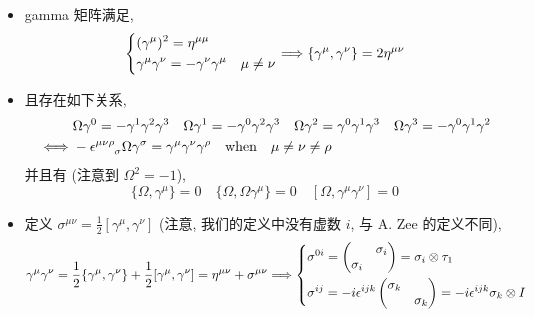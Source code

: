 \begin{itemize}
	\noindent\rule[0.5ex]{\linewidth}{0.5pt} %
	
	\item gamma 矩阵满足,
	\begin{equation}
		\begin{dcases}
			(\gamma^\mu)^2 = \eta^{\mu \mu} \\
			\gamma^\mu \gamma^\nu = - \gamma^\nu \gamma^\mu & \mu \neq \nu
		\end{dcases} \Longrightarrow \{\gamma^\mu, \gamma^\nu\} = 2 \eta^{\mu \nu}
	\end{equation}
	
	\item 且存在如下关系,
	\begin{align}
		& \Omega \gamma^0 = - \gamma^1 \gamma^2 \gamma^3 \quad \Omega \gamma^1 = - \gamma^0 \gamma^2 \gamma^3 \quad \Omega \gamma^2 = \gamma^0 \gamma^1 \gamma^3 \quad \Omega \gamma^3 = - \gamma^0 \gamma^1 \gamma^2 \notag \\
		\iff & - \tensor{\epsilon}{^{\mu \nu \rho}_\sigma} \Omega \gamma^\sigma = \gamma^\mu \gamma^\nu \gamma^\rho \quad \text{when} \quad \mu \neq \nu \neq \rho
	\end{align}
	并且有 (注意到 $\Omega^2 = - 1$),
	\begin{equation}
		\{\Omega, \gamma^\mu\} = 0 \quad \{\Omega, \Omega \gamma^\mu\} = 0 \quad [\Omega, \gamma^\mu \gamma^\nu] = 0
	\end{equation}
	
	\noindent\hdashrule[0.5ex]{\linewidth}{0.5pt}{1mm} %
	
	\item 定义 $\sigma^{\mu \nu} = \frac{1}{2} [\gamma^\mu, \gamma^\nu]$ (注意, 我们的定义中没有虚数 $i$, 与 A. Zee 的定义不同),
	\begin{equation}
		\gamma^\mu \gamma^\nu = \frac{1}{2} \{\gamma^\mu, \gamma^\nu\} + \frac{1}{2} [\gamma^\mu, \gamma^\nu] = \eta^{\mu \nu} + \sigma^{\mu \nu} \Longrightarrow \begin{dcases}
			\sigma^{0 i} = \begin{pmatrix}
				& \sigma_i \\
				\sigma_i &
			\end{pmatrix} = \sigma_i \otimes \tau_1 \\
			\sigma^{i j} = - i \epsilon^{i j k} \begin{pmatrix}
				\sigma_k & \\
				& \sigma_k
			\end{pmatrix} = - i \epsilon^{i j k} \sigma_k \otimes I
		\end{dcases}
	\end{equation}
\end{itemize}

